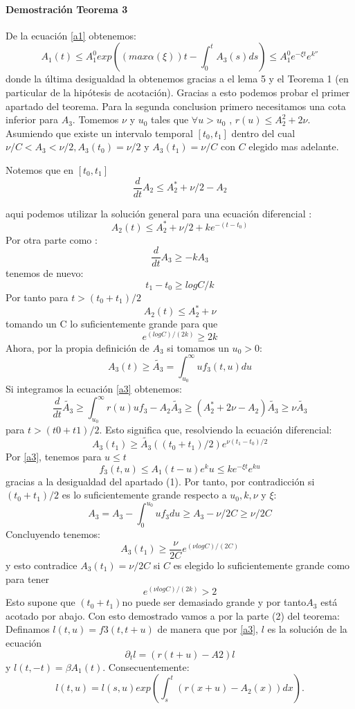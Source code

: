 \documentclass[1p]{elsarticle}
\begin{document}
\paragraph{Demostración Teorema 3}De la ecuación \ref{a1} obtenemos:
$$A_1(t)\leq A_1^0exp((max \alpha(\xi))t-\int_{0}^{t}A_3(s)ds)\leq A_1^0e^{-\xi t}e^{k''}$$
donde la última desigualdad la obtenemos gracias a el lema 5 y el Teorema 1 (en particular de la hipótesis de acotación). Gracias a esto podemos probar el primer apartado del teorema.
Para la segunda conclusion primero necesitamos una cota inferior para $A_3$.
Tomemos $\nu$ y $u_0$ tales que $\forall u>u_0$ , $r(u)\leq A_2^2 +2\nu$. Asumiendo que existe un intervalo temporal $[t_0 , t_1 ]$ dentro del cual $\nu / C<A_3 <\nu / 2, A_3 (t_0 ) = \nu / 2$ y $A_3 (t_1 ) = \nu / C$ con $C$ elegido mas adelante.

Notemos que en $[t_0 , t_1 ]$
$$\frac{d}{dt} A_2 \leq A_2^* +\nu / 2-A_2$$

aqui podemos utilizar la solución general para una ecuación diferencial :
$$A_2 (t)\leq A_2^* +\nu / 2+k e^{-(t-t_0 )}$$
Por otra parte como :
$$\frac{d}{dt}
A_3 \geq -kA_3
$$
tenemos de nuevo:
$$t_1 -t_0 \geq log C/k$$
Por tanto para $t>(t_0 +t_1 ) / 2$
\begin{equation}
A_2 (t)\leq A_2^* +\nu
\end{equation}
tomando un C lo suficientemente grande para que
$$e^{(log C)/(2k)} \geq 2k$$
Ahora, por la propia definición de $A_3$ si tomamos un $u_0>0$:
$$A_3 (t)\geq \widetilde{A_3} =\int_{u_0}^{\infty}uf_3 (t, u) du$$
Si integramos la ecuación \ref{a3} obtenemos:
$$\frac{d}{dt} \widetilde{A_3} \geq\int_{u_0}^{\infty}r(u)uf_3 -A_2 \widetilde{A_3} \geq(A_2^* +2\nu-A_2 ) \widetilde{A_3} \geq \nu \widetilde{A_3}$$
para  $t>(t 0 +t 1 ) / 2$. Esto significa que, resolviendo la ecuación diferencial:
$$A_3 (t_1 )\geq \widetilde{A_3} ((t_0 +t_1 ) / 2)e ^{\nu (t_1 -t_0 )/2}$$
Por \ref{a3}, tenemos para  $u\leq t$ 
$$f_3 (t, u)\leq A_1 (t -u)e^ku \leq ke^{ - \xi t} e^{ku}$$
gracias a la desigualdad del apartado (1). 
Por tanto, por contradicción si $(t_0 +t_1 ) / 2$ es lo suficientemente grande respecto a $u_0 , k, \nu$ y $\xi$:
$$A_3=A_3-\int_{0}^{u_0}uf_3du\geq A_3-\nu/2C\geq\nu/2C$$
Concluyendo tenemos:
$$A_3(t_1)\geq \frac{\nu}{2C}e^{(\nu logC)/(2C)}$$
y esto contradice $A_3 (t_1 ) =\nu / 2C $ si $C$ es elegido lo suficientemente grande como para tener
$$e ^{( \nu log C)/(2k)} >2$$
Esto supone que $ (t_0 +t_1 ) $no puede ser demasiado grande y por tanto$ A_3$ está acotado por abajo. 
Con esto demostrado vamos a por la parte (2) del teorema:
Definamos $l(t, u) = f 3 (t, t +u)$ de manera que por \ref{a3}, $l$ es la solución de la ecuación
$$\partial_t l = (r(t +u)-A 2 )l$$
y $l(t, -t) = \beta A_1 (t)$.
Consecuentemente:
$$l(t, u) = l(s, u) exp(\int_{s}^{t}(r(x+u)-A_2(x))dx).$$
\end{document}
